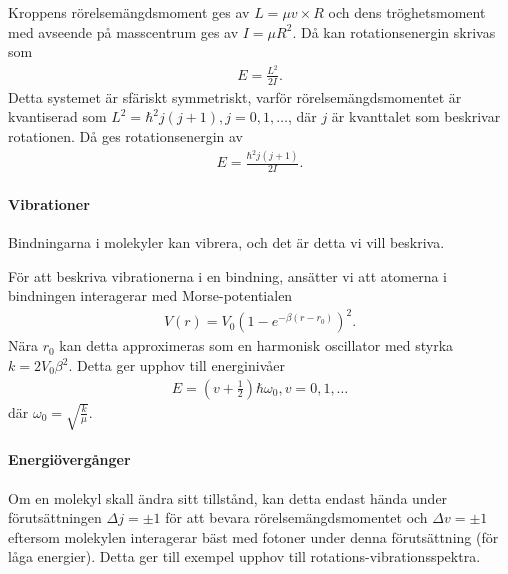 Kroppens rörelsemängdsmoment ges av $L = \mu v\times R$ och dens tröghetsmoment med avseende på masscentrum ges av $I = \mu R^{2}$. Då kan rotationsenergin skrivas som
\begin{align*}
	E = \frac{L^{2}}{2I}.
\end{align*}
Detta systemet är sfäriskt symmetriskt, varför rörelsemängdsmomentet är kvantiserad som $L^{2} = \hbar^{2}j(j + 1), j = 0, 1, \dots$, där $j$ är kvanttalet som beskrivar rotationen. Då ges rotationsenergin av
\begin{align*}
	E = \frac{\hbar^{2}j(j + 1)}{2I}.
\end{align*}

\paragraph{Vibrationer}
Bindningarna i molekyler kan vibrera, och det är detta vi vill beskriva.

För att beskriva vibrationerna i en bindning, ansätter vi att atomerna i bindningen interagerar med Morse-potentialen
\begin{align*}
	V(r) = V_{0}\left(1 - e^{-\beta(r - r_{0})}\right)^{2}.
\end{align*}
Nära $r_{0}$ kan detta approximeras som en harmonisk oscillator med styrka $k = 2V_{0}\beta^{2}$. Detta ger upphov till energinivåer
\begin{align*}
	E = (v + \frac{1}{2})\hbar\omega_{0}, v = 0, 1, \dots
\end{align*}
där $\omega_{0} = \sqrt{\frac{k}{\mu}}$.

\paragraph{Energiövergånger}
Om en molekyl skall ändra sitt tillstånd, kan detta endast hända under förutsättningen $\Delta j = \pm 1$ för att bevara rörelsemängdsmomentet och $\Delta v = \pm 1$ eftersom molekylen interagerar bäst med fotoner under denna förutsättning (för låga energier). Detta ger till exempel upphov till rotations-vibrationsspektra.